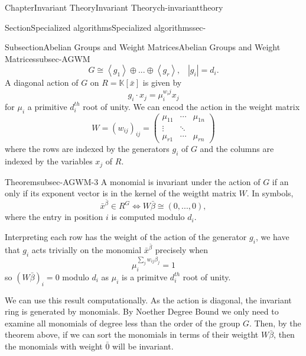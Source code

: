 \documentclass[oneside,10pt,]{book}
\newcommand{\amp}{&}
\begin{document}
\begin{chapterptx}{Chapter}{Invariant Theory}{}{Invariant Theory}{}{}{ch-invarianttheory}
\begin{sectionptx}{Section}{Specialized algorithms}{}{Specialized algorithms}{}{}{sec-}
\begin{subsectionptx}{Subsection}{Abelian Groups and Weight Matrices}{}{Abelian Groups and Weight Matrices}{}{}{subsec-AGWM}
\begin{equation*}
G \cong \left\langle g_1\right\rangle \oplus...\oplus\left\langle g_r \right\rangle, \,\,\,\,\, |g_i| =d_i.
\end{equation*}
A diagonal action of \(G\) on \(R= \mathbb{K}[\bar x]\) is given by%
\begin{equation*}
g_i \cdot x_j = \mu_i^{w_ij}x_j
\end{equation*}
for \(\mu_i \) a primitive \(d_i^{th}\) root of unity. We can encod the action in the weight matrix%
\begin{equation*}
W = (w_{ij})_{ij} =  
\begin{pmatrix}
\mu_{11} \amp \cdots     \amp   \mu_{1n}   \\
\vdots \amp \ddots \amp      \\
\mu_{r1}  \amp    \cdots     \amp   \mu_{rn}  
\end{pmatrix}
\end{equation*}
where the rows are indexed by the generators \(g_i\) of \(G\) and the columns are indexed by the variables \(x_j\) of \(R\).%
\begin{theorem}{Theorem}{}{}{subsec-AGWM-3}%
A monomial is invariant under the action of \(G\) if an only if its exponent vector is in the kernel of the weigtht matrix \(W \). In symbols,%
\begin{equation*}
\bar x^{\bar \beta} \in R^G \iff W \bar \beta \cong (0,...,0),
\end{equation*}
where the entry in position \(i\) is computed modulo \(d_i\).%
\end{theorem}
Interpreting each row has the weight of the action of the generator \(g_i\), we have that \(g_i\) acts trivially on the monomial \(\bar x^{\bar \beta}\) precisely when%
\begin{equation*}
\mu_i^{\sum_j w_{ij} \beta_j} = 1
\end{equation*}
so \((W \bar \beta)_i =0\) modulo \(d_i\) as \(\mu_i\) is a primitve \(d_i^{th}\) root of unity.%
\par
We can use this result computationally. As the action is diagonal, the invariant ring is generated by monomials. By Noether Degree Bound we only need to examine all monomials of degree less than the order of the group \(G\). Then, by the theorem above, if we can sort the monomials in terms of their weigtht \(W\bar \beta\), then the monomials with weight \(\bar 0\) will be invariant.%
\end{subsectionptx}
%
%
\typeout{************************************************}
\typeout{************************************************}

\end{sectionptx}
\end{chapterptx}
\end{document}
